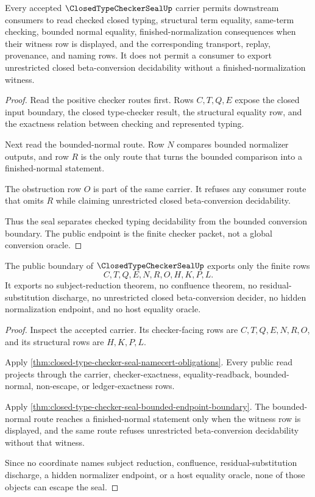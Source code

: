 \begin{theorem}
\label{thm:closed-type-checker-seal-bounded-endpoint-boundary}
Every accepted $\ClosedTypeCheckerSealUp$ carrier permits downstream consumers to read checked closed typing, structural term equality, same-term checking, bounded normal equality, finished-normalization consequences when their witness row is displayed, and the corresponding transport, replay, provenance, and naming rows. It does not permit a consumer to export unrestricted closed beta-conversion decidability without a finished-normalization witness.
\end{theorem}
\begin{proof}
Read the positive checker routes first. Rows $C,T,Q,E$ expose the closed input boundary, the closed type-checker result, the structural equality row, and the exactness relation between checking and represented typing.

Next read the bounded-normal route. Row $N$ compares bounded normalizer outputs, and row $R$ is the only route that turns the bounded comparison into a finished-normal statement.

The obstruction row $O$ is part of the same carrier. It refuses any consumer route that omits $R$ while claiming unrestricted closed beta-conversion decidability.

Thus the seal separates checked typing decidability from the bounded conversion boundary. The public endpoint is the finite checker packet, not a global conversion oracle.
\end{proof}

\begin{theorem}
\label{thm:closed-type-checker-seal-nonescape}
The public boundary of $\ClosedTypeCheckerSealUp$ exports only the finite rows
$$
C,T,Q,E,N,R,O,H,K,P,L.
$$
It exports no subject-reduction theorem, no confluence theorem, no residual-substitution discharge, no unrestricted closed beta-conversion decider, no hidden normalization endpoint, and no host equality oracle.
\end{theorem}
\begin{proof}
Inspect the accepted carrier. Its checker-facing rows are $C,T,Q,E,N,R,O$, and its structural rows are $H,K,P,L$.

Apply \autoref{thm:closed-type-checker-seal-namecert-obligations}. Every public read projects through the carrier, checker-exactness, equality-readback, bounded-normal, non-escape, or ledger-exactness rows.

Apply \autoref{thm:closed-type-checker-seal-bounded-endpoint-boundary}. The bounded-normal route reaches a finished-normal statement only when the witness row is displayed, and the same route refuses unrestricted beta-conversion decidability without that witness.

Since no coordinate names subject reduction, confluence, residual-substitution discharge, a hidden normalizer endpoint, or a host equality oracle, none of those objects can escape the seal.
\end{proof}

